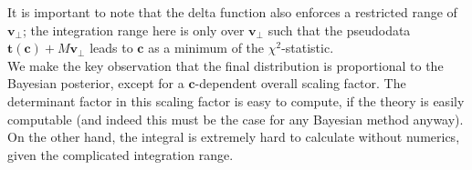 \documentclass[withindex,glossary]{cam-thesis}
\renewcommand{\vec}[1]{\textbf{#1}} %
\begin{document}
\noindent It is important to note that the delta function also enforces a restricted range of $\vec{v}_{\perp}$; the integration range here is only over $\vec{v}_{\perp}$ such that the pseudodata $\vec{t}(\vec{c}) + M\vec{v}_{\perp}$ leads to $\vec{c}$ as a minimum of the $\chi^2$-statistic.\\

\noindent We make the key observation that the final distribution is proportional to the Bayesian posterior, except for a $\vec{c}$-dependent overall scaling factor. The determinant factor in this scaling factor is easy to compute, if the theory is easily computable (and indeed this must be the case for any Bayesian method anyway). On the other hand, the integral is extremely hard to calculate without numerics, given the complicated integration range.
\end{document}
